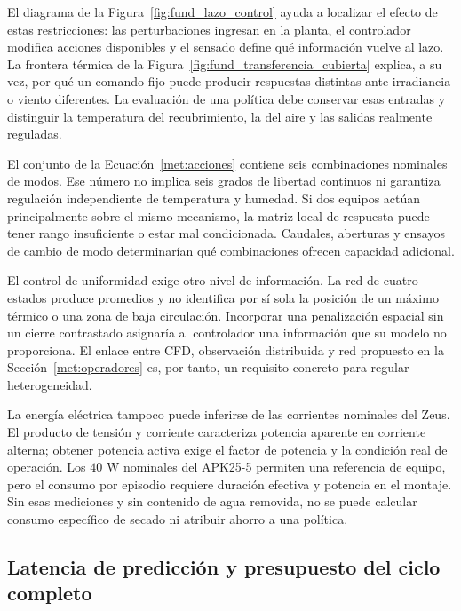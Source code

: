 El diagrama de la Figura~\ref{fig:fund_lazo_control} ayuda a localizar el efecto de estas restricciones: las perturbaciones ingresan en la planta, el controlador modifica acciones disponibles y el sensado define qué información vuelve al lazo. La frontera térmica de la Figura~\ref{fig:fund_transferencia_cubierta} explica, a su vez, por qué un comando fijo puede producir respuestas distintas ante irradiancia o viento diferentes. La evaluación de una política debe conservar esas entradas y distinguir la temperatura del recubrimiento, la del aire y las salidas realmente reguladas.

El conjunto de la Ecuación~\eqref{met:acciones} contiene seis combinaciones nominales de modos. Ese número no implica seis grados de libertad continuos ni garantiza regulación independiente de temperatura y humedad. Si dos equipos actúan principalmente sobre el mismo mecanismo, la matriz local de respuesta puede tener rango insuficiente o estar mal condicionada. Caudales, aberturas y ensayos de cambio de modo determinarían qué combinaciones ofrecen capacidad adicional.

El control de uniformidad exige otro nivel de información. La red de cuatro estados produce promedios y no identifica por sí sola la posición de un máximo térmico o una zona de baja circulación. Incorporar una penalización espacial sin un cierre contrastado asignaría al controlador una información que su modelo no proporciona. El enlace entre CFD, observación distribuida y red propuesto en la Sección~\ref{met:operadores} es, por tanto, un requisito concreto para regular heterogeneidad.

La energía eléctrica tampoco puede inferirse de las corrientes nominales del Zeus. El producto de tensión y corriente caracteriza potencia aparente en corriente alterna; obtener potencia activa exige el factor de potencia y la condición real de operación. Los $40$ W nominales del APK25-5 permiten una referencia de equipo, pero el consumo por episodio requiere duración efectiva y potencia en el montaje. Sin esas mediciones y sin contenido de agua removida, no se puede calcular consumo específico de secado ni atribuir ahorro a una política.

\subsection{Latencia de predicción y presupuesto del ciclo completo}

